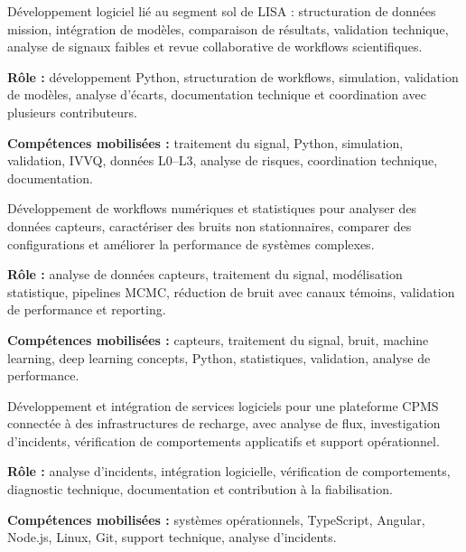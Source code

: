 \documentclass[8pt,a4paper,ragged2e,withhyper]{altacv}
\begin{document}
Développement logiciel lié au segment sol de LISA : structuration de données mission, intégration de modèles, comparaison de résultats, validation technique, analyse de signaux faibles et revue collaborative de workflows scientifiques.

\textbf{Rôle :} développement Python, structuration de workflows, simulation, validation de modèles, analyse d’écarts, documentation technique et coordination avec plusieurs contributeurs.

\textbf{Compétences mobilisées :} traitement du signal, Python, simulation, validation, IVVQ, données L0--L3, analyse de risques, coordination technique, documentation.

\divider


Développement de workflows numériques et statistiques pour analyser des données capteurs, caractériser des bruits non stationnaires, comparer des configurations et améliorer la performance de systèmes complexes.

\textbf{Rôle :} analyse de données capteurs, traitement du signal, modélisation statistique, pipelines MCMC, réduction de bruit avec canaux témoins, validation de performance et reporting.

\textbf{Compétences mobilisées :} capteurs, traitement du signal, bruit, machine learning, deep learning concepts, Python, statistiques, validation, analyse de performance.

\divider


Développement et intégration de services logiciels pour une plateforme CPMS connectée à des infrastructures de recharge, avec analyse de flux, investigation d’incidents, vérification de comportements applicatifs et support opérationnel.

\textbf{Rôle :} analyse d’incidents, intégration logicielle, vérification de comportements, diagnostic technique, documentation et contribution à la fiabilisation.

\textbf{Compétences mobilisées :} systèmes opérationnels, TypeScript, Angular, Node.js, Linux, Git, support technique, analyse d’incidents.

\end{document}
